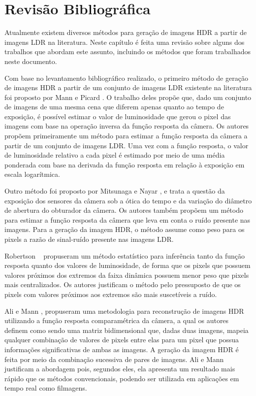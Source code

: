 \section{Revisão Bibliográfica} \label{revisaoHDR}
Atualmente existem diversos métodos para geração de imagens HDR a partir de imagens LDR na literatura. Neste capítulo é feita uma revisão sobre alguns dos trabalhos que abordam este assunto, incluindo os métodos que foram trabalhados neste documento.


Com base no levantamento bibliográfico realizado, o primeiro método de geração de imagens HDR a partir de um conjunto de imagens LDR existente na literatura foi proposto por Mann e Picard \cite{mann}. O trabalho deles propõe que, dado um conjunto de imagens de uma mesma cena que diferem apenas quanto ao tempo de exposição, é possível estimar o valor de luminosidade que gerou o pixel das imagens com base na operação inversa da função resposta da câmera. Os autores propõem primeiramente um método para estimar a função resposta da câmera a partir de um conjunto de imagens LDR. Uma vez com a função resposta, o valor de luminosidade relativo a cada pixel é estimado por meio de uma média ponderada com base na derivada da função resposta em relação à exposição em escala logarítmica.


Outro método foi proposto por Mitsunaga e Nayar \cite{mitsunaga}, e trata a questão da exposição dos sensores da câmera sob a ótica do tempo e da variação do diâmetro de abertura do obturador da câmera. Os autores também propõem um método para estimar a função resposta da câmera que leva em conta o ruído presente nas imagens. Para a geração da imagem HDR, o método assume como peso para os pixels a razão de sinal-ruído presente nas imagens LDR.


Robertson \etal~\cite{robertson} propuseram um método estatístico para inferência tanto da função resposta quanto dos valores de luminosidade, de forma que os pixels que possuem valores próximos dos extremos da faixa dinâmica possuem menor peso que pixels mais centralizados. Os autores justificam o método pelo pressuposto de que os pixels com valores próximos aos extremos são mais suscetíveis a ruído.


Ali e Mann \cite{ali}, propuseram uma metodologia para reconstrução de imagens HDR utilizando a função resposta comparamétrica da câmera, a qual os autores definem como sendo uma matriz bidimensional que, dadas duas imagens, mapeia qualquer combinação de valores de pixels entre elas para um pixel que possua informações significativas de ambas as imagens. A geração da imagem HDR é feita por meio da combinação sucessiva de pares de imagens. Ali e Mann justificam a abordagem pois, segundos eles, ela apresenta um resultado mais rápido que os métodos convencionais, podendo ser utilizada em aplicações em tempo real como filmagens.


